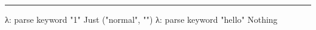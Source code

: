 \documentclass[]{article}
\newenvironment{Shaded}{}{}
\newcommand{\DataTypeTok}[1]{\textcolor[rgb]{0.56,0.13,0.00}{#1}}
\newcommand{\FunctionTok}[1]{\textcolor[rgb]{0.02,0.16,0.49}{#1}}
\newcommand{\NormalTok}[1]{#1}
\newcommand{\StringTok}[1]{\textcolor[rgb]{0.25,0.44,0.63}{#1}}
\begin{document}
\begin{center}\rule{0.5\linewidth}{\linethickness}\end{center}

\begin{Shaded}
\begin{Highlighting}[]
\NormalTok{λ}\FunctionTok{:}\NormalTok{ parse keyword }\StringTok{"1"}
\DataTypeTok{Just}\NormalTok{ (}\StringTok{"normal"}\NormalTok{, }\StringTok{""}\NormalTok{)}
\NormalTok{λ}\FunctionTok{:}\NormalTok{ parse keyword }\StringTok{"hello"}
\DataTypeTok{Nothing}
\end{Highlighting}
\end{Shaded}
\end{document}
